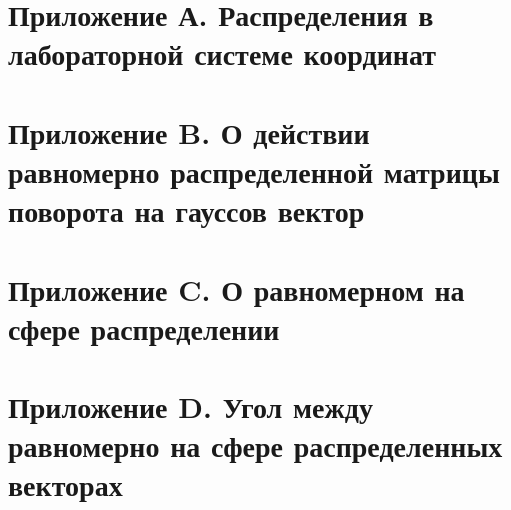 \documentclass[12pt]{article}
\begin{document}
\begin{appendices}
\section{Приложение А. Распределения в лабораторной системе координат} \label{app1}



\section{Приложение B. О действии равномерно распределенной матрицы поворота на гауссов вектор} \label{app2}



\section{Приложение C. О равномерном на сфере распределении} \label{app3}



\section{Приложение D. Угол между равномерно на сфере распределенных векторах} \label{app4}



\end{appendices}
\end{document}
